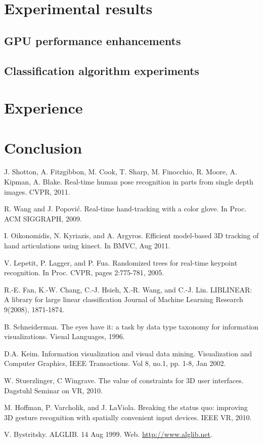 \documentclass[letterpaper,twocolumn,10pt]{article}
\begin{document}
\section{Experimental results}
\subsection{GPU performance enhancements}
\subsection{Classification algorithm experiments}

\section{Experience}

\section{Conclusion}


\begin{thebibliography}{9}

 J. Shotton, A. Fitzgibbon, M. Cook, T. Sharp, M. Finocchio, R. Moore, A. Kipman, A. Blake. Real-time human pose recognition in parts from single depth images. CVPR, 2011.

 R. Wang and J. Popovi\'c. Real-time hand-tracking with a color glove. In Proc. ACM SIGGRAPH, 2009.

 I. Oikonomidis, N. Kyriazis, and A. Argyros. Efficient model-based 3D tracking of hand articulations using kinect. In BMVC, Aug 2011.

 V. Lepetit, P. Lagger, and P. Fua. Randomized trees for real-time keypoint recognition. In Proc. CVPR, pages 2:775-781, 2005. 

 R.-E. Fan, K.-W. Chang, C.-J. Hsieh, X.-R. Wang, and C.-J. Lin. LIBLINEAR: A library for large linear classification Journal of Machine Learning Research 9(2008), 1871-1874.

 B. Schneiderman. The eyes have it: a task by data type taxonomy for information visualizations. Visual Languages, 1996.

 D.A. Keim. Information visualization and visual data mining. Visualization and Computer Graphics, IEEE Transactions. Vol 8, no.1, pp. 1-8, Jan 2002.

 W. Stuerzlinger, C Wingrave. The value of constraints for 3D user interfaces. Dagstuhl Seminar on VR, 2010.

 M. Hoffman, P. Varcholik, and J. LaViola. Breaking the status quo: improving 3D gesture recognition with spatially convenient input devices. IEEE VR, 2010.

 V. Bystritsky. ALGLIB. 14 Aug 1999. Web. \url{http://www.alglib.net}.

\end{thebibliography}
\end{document}
